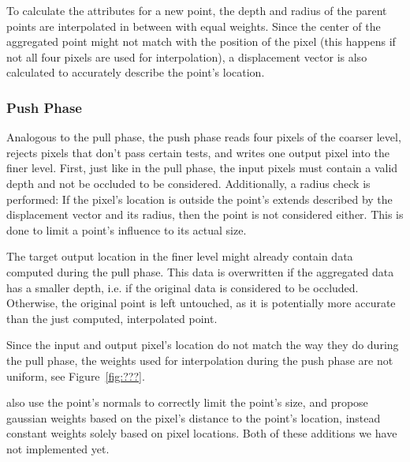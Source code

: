 To calculate the attributes for a new point, the depth and radius of the parent points are interpolated in between with equal weights. Since the center of the aggregated point might not match with the position of the pixel (this happens if not all four pixels are used for interpolation), a displacement vector is also calculated to accurately describe the point's location.


\subsubsection{Push Phase}

Analogous to the pull phase, the push phase reads four pixels of the coarser level, rejects pixels that don't pass certain tests, and writes one output pixel into the finer level. First, just like in the pull phase, the input pixels must contain a valid depth and not be occluded to be considered. Additionally, a radius check is performed: If the pixel's location is outside the point's extends described by the displacement vector and its radius, then the point is not considered either. This is done to limit a point's influence to its actual size.

The target output location in the finer level might already contain data computed during the pull phase. This data is overwritten if the aggregated data has a smaller depth, i.e. if the original data is considered to be occluded. Otherwise, the original point is left untouched, as it is potentially more accurate than the just computed, interpolated point.

Since the input and output pixel's location do not match the way they do during the pull phase, the weights used for interpolation during the push phase are not uniform, see Figure~\ref{fig:???}.

 \cite{Marroquim:2007:reconstruction} also use the point's normals to correctly limit the point's size, and \cite{Marroquim:2008:reconstruction2} propose gaussian weights based on the pixel's distance to the point's location, instead constant weights solely based on pixel locations. Both of these additions we have not implemented yet.
